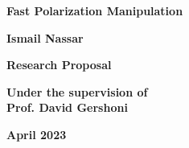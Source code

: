 \thispagestyle{empty}
\begin{center}
\Large

\textbf{Fast Polarization Manipulation}

\vspace{2.0in}

\textbf{Ismail Nassar}

\vspace{1.5in}

\textbf{Research Proposal}

\vspace{0.5in}

\textbf{Under the supervision of}\\
\textbf{Prof. David Gershoni}

\vspace{0.5in}

\textbf{April 2023}
\end{center}
